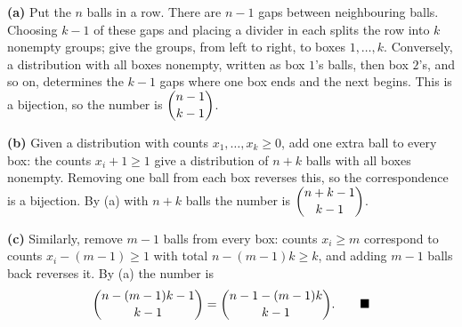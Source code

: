 \textbf{(a)} Put the $n$ balls in a row. There are $n-1$ gaps between neighbouring balls. Choosing $k-1$ of these gaps and placing a divider in each splits the row into $k$ nonempty groups; give the groups, from left to right, to boxes $1,\dots,k$. Conversely, a distribution with all boxes nonempty, written as box $1$'s balls, then box $2$'s, and so on, determines the $k-1$ gaps where one box ends and the next begins. This is a bijection, so the number is $\dbinom{n-1}{k-1}$.

\textbf{(b)} Given a distribution with counts $x_1,\dots,x_k\ge0$, add one extra ball to every box: the counts $x_i+1\ge1$ give a distribution of $n+k$ balls with all boxes nonempty. Removing one ball from each box reverses this, so the correspondence is a bijection. By (a) with $n+k$ balls the number is $\dbinom{n+k-1}{k-1}$.

\textbf{(c)} Similarly, remove $m-1$ balls from every box: counts $x_i\ge m$ correspond to counts $x_i-(m-1)\ge1$ with total $n-(m-1)k\ge k$, and adding $m-1$ balls back reverses it. By (a) the number is
\[\dbinom{n-(m-1)k-1}{k-1}=\dbinom{n-1-(m-1)k}{k-1}.\qquad\blacksquare\]
